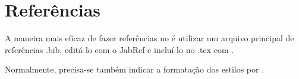 \documentclass{article}
\begin{document}
	\section{Referências}
		A maneira mais eficaz de fazer referências no \LaTeXe é utilizar um arquivo principal de referências \textsf{.bib}, editá-lo com o \textsf{JabRef} e incluí-lo no \textsf{.tex} com \newline\verb||. 
		
		Normalmente, precisa-se também indicar a formatação dos estilos por \verb||.

		
\nocite{Knuth:1997:ACP:260999,Knuth:1997:ACP:270146,Knuth:1998:ACP:280635}


\end{document}
